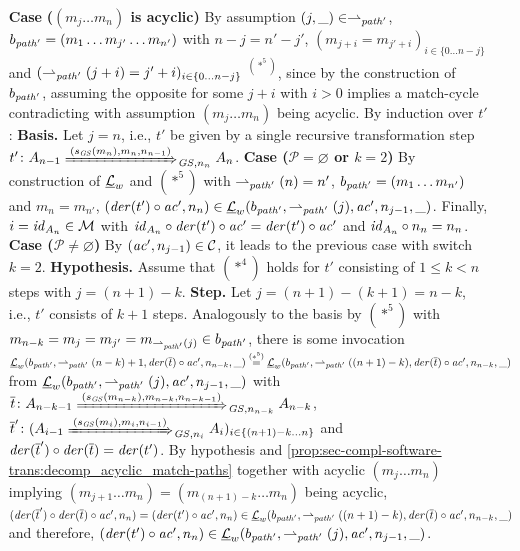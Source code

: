 \begin{enumerate}
  \item[\textbf{Case}] \textbf{($(m_j\ldots m_n)$ is acyclic)}
  By assumption $(j,\_) \in \rightharpoonup_{\mathit{path}'}$, $b_{\mathit{path}'}=(m_1\ldots m_{j'}\ldots m_{n'})$ with $n-j=n'-j'$, $(m_{j+i}=m_{j'+i})_{i \in \{0\ldots n-j\}}$ and $(\rightharpoonup_{\mathit{path}'}(j+i)=j'+i)_{i \in \{0\ldots n-j\}}$ $^{(*^5)}$, since by the construction of $b_{\mathit{path}'}$, assuming the opposite for some $j+i$ with $i > 0 $ implies a match-cycle contradicting with assumption $(m_j\ldots m_n)$ being acyclic.
  By induction over $t'$:
  \textbf{Basis.} Let $j=n$, i.e., $t'$ be given by a single recursive transformation step $t'\colon A_{n-1} \Trans{(s_\GS(m_n),m_n,n_{n-1})}_{\GS,n_n} A_n$.
  \textbf{Case ($\mathcal{P}=\varnothing$ or $k=2$)} By construction of $\underline{\mathcal{L}}_w$ and $(*^5)$ with $\rightharpoonup_{\mathit{path}'}(n)=n'$, $b_{\mathit{path}'}=(m_1\ldots m_{n'})$ and $m_n=m_{n'}$, $(\mathit{der}(t')\circ \mathit{ac}',n_n) \in \underline{\mathcal{L}}_w(b_{\mathit{path}'},\rightharpoonup_{\mathit{path}'}(j),\mathit{ac}',n_{j-1},\_)$.
  Finally, $i=\mathit{id}_{A_n} \in {\cal M}$ with $\mathit{id}_{A_n} \circ \mathit{der}(t') \circ \mathit{ac}'=\mathit{der}(t') \circ \mathit{ac}'$ and $\mathit{id}_{A_n} \circ n_n=n_n$.
  \textbf{Case ($\mathcal{P}\neq\varnothing$)} By $(\mathit{ac}',n_{j-1}) \in \mathcal{C}$, it leads to the previous case with switch $k=2$.
  \textbf{Hypothesis.} Assume that $(*^4)$ holds for $t'$ consisting of $1 \leq k < n$ steps with $j=(n+1)-k$.
  \textbf{Step.} Let $j=(n+1)-(k+1)=n-k$, i.e., $t'$ consists of $k+1$ steps.
  Analogously to the basis by $(*^5)$ with $m_{n-k}=m_j=m_{j'}=m_{\rightharpoonup_{\mathit{path}'}(j)} \in b_{\mathit{path}'}$, there is some invocation $\underline{\mathcal{L}}_w(b_{\mathit{path}'},\rightharpoonup_{\mathit{path}'}(n-k)+1,\mathit{der}(\overline{t}) \circ \mathit{ac}',n_{n-k},\_) \stackrel{(*^5)}{=} \underline{\mathcal{L}}_w(b_{\mathit{path}'},\rightharpoonup_{\mathit{path}'}((n+1)-k),\mathit{der}(\overline{t}) \circ \mathit{ac}',n_{n-k},\_)$ from $\underline{\mathcal{L}}_w(b_{\mathit{path}'},\rightharpoonup_{\mathit{path}'}(j),\mathit{ac}',n_{j-1},\_)$ with $\overline{t}\colon A_{n-k-1} \Trans{(s_\GS(m_{n-k}),m_{n-k},n_{n-k-1})}_{\GS,n_{n-k}} A_{n-k}$, $\overline{t}'\colon (A_{i-1} \Trans{(s_\GS(m_i),m_i,n_{i-1})}_{\GS,n_i} A_i)_{i \in \{(n+1)-k\ldots n\}}$ and $\mathit{der}(\overline{t}') \circ \mathit{der}(\overline{t})=\mathit{der}(t')$.
  By hypothesis and \cref{prop:sec-compl-software-trans:decomp_acyclic_match-paths} together with acyclic $(m_j\ldots m_n)$ implying $(m_{j+1}\ldots m_n)=(m_{(n+1)-k}\ldots m_n)$ being acyclic, $(\mathit{der}(\overline{t}') \circ \mathit{der}(\overline{t}) \circ \mathit{ac}',n_n)=(\mathit{der}(t') \circ \mathit{ac}',n_n) \in \underline{\mathcal{L}}_w(b_{\mathit{path}'},\rightharpoonup_{\mathit{path}'}((n+1)-k),\mathit{der}(\overline{t})\circ \mathit{ac}',n_{n-k},\_)$ and therefore, $(\mathit{der}(t') \circ \mathit{ac}',n_n) \in \underline{\mathcal{L}}_w(b_{\mathit{path}'},\rightharpoonup_{\mathit{path}'}(j),\mathit{ac}',n_{j-1},\_)$.

\end{enumerate}
